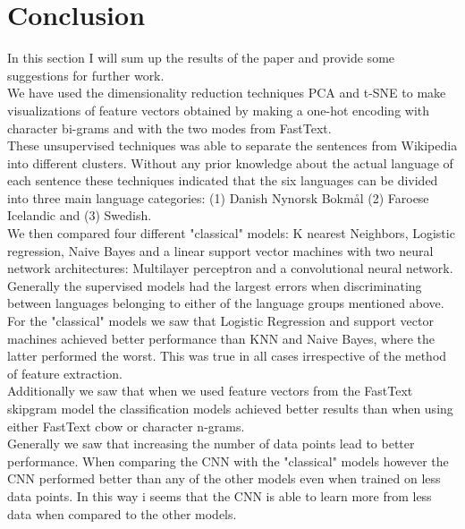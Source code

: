 \section{Conclusion}
In this section I will sum up the results of the paper and provide some suggestions for further work.\\

We have used the dimensionality reduction techniques PCA and t-SNE to make visualizations of feature vectors obtained by making a one-hot encoding with character bi-grams and with the two modes from FastText.\\

These unsupervised techniques was able to separate the sentences from Wikipedia into different clusters.
Without any prior knowledge about the actual language of each sentence these techniques indicated that the six languages can be divided into three main language categories: (1) Danish Nynorsk Bokmål (2) Faroese Icelandic and (3) Swedish.\\

We then compared four different "classical" models: K nearest Neighbors, Logistic regression, Naive Bayes and a linear support vector machines with two neural network architectures: Multilayer perceptron and a convolutional neural network.\\

Generally the supervised models had the largest errors when discriminating between languages belonging to either of the language groups mentioned above.\\

For the "classical" models we saw that Logistic Regression and support vector machines achieved better performance than KNN and Naive Bayes, where the latter performed the worst. This was true in all cases irrespective of the method of feature extraction.\\

Additionally we saw that when we used feature vectors from the FastText skipgram model the classification models achieved better results than when using either FastText cbow or character n-grams.\\

Generally we saw that increasing the number of data points lead to better performance. When comparing the CNN with the "classical" models however the CNN performed better than any of the other models even when trained on less data points. In this way i seems that the CNN is able to learn more from less data when compared to the other models.\\

